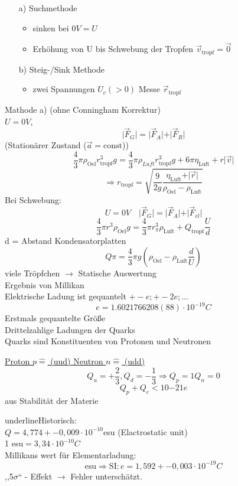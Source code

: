 \documentclass[titlepage,12pt,a4paper,ngerman]{report}
\newcommand{\tx}[1]{\textrm{#1}}
\begin{document}
\begin{itemize}
\item[a)] Suchmethode
\begin{itemize}
\item sinken bei $0V= U$
\item Erhöhung von U bis Schwebung der Tropfen $\vec{v}_{\textrm{tropf}} = \vec{0}$
\end{itemize}
\item[b)] Steig-/Sink Methode
\begin{itemize}
\item zwei Spannungen $U_c(>0)$ Messe $\vec{r}_{\tx{tropf}}$
\end{itemize}
\end{itemize}
Mathode a) (ohne Conningham Korrektur)\\
$U = 0V$, $$\vert \vec{F}_G \vert = \vert \vec{F}_A \vert + \vert \vec{F}_R \vert$$ (Stationärer Zustand ($\vec{a} = \tx{const}$))
$$\frac{4}{3} \pi \rho_{\tx{Oel}} r^3_{\tx{tropf}} g = \frac{4}{3} \pi \rho_{Luft} r_{\tx{tropf}}^3 g + 6 \pi \eta_{\tx{Luft}} + r \vert \vec{v} \vert$$
$$\Rightarrow r_{\tx{tropf}} = \sqrt{\frac{9}{2g} \frac{\eta_{\tx{Luft}} + \vert \vec{r} \vert }{\rho_{\tx{Oel}}-\rho_{\tx{Luft}}}}$$
Bei Schwebung:
$$U = 0V \quad \vert \vec{F}_G \vert = \vert \vec{F}_A \vert + \vert \vec{F}_{el} \vert$$
$$\frac{4}{3} \pi r^3 \rho_{\tx{Oel}} g = \frac{4}{3} \pi r^3_{\pi} \rho_{\tx{Luft}} + Q_{\tx{tropf}} \frac{U}{d}$$
 d = Abstand Kondensatorplatten
$$Q\pi = \frac{4}{3}	\pi g(\rho_{\tx{Oel}}-\rho_{\tx{Luft}} \frac{d}{U})$$
viele Tröpfchen $\rightarrow$ Statische Auswertung\\
Ergebnis von Millikan \\%
Elektrische Ladung ist gequantelt $+- e;+-2e;\dots$
$$e = 1.6021766208(88) \cdot 10^{-19} C$$
Erstmals gequantelte Größe\\
Drittelzahlige Ladungen der Quarks\\
Quarks sind Konstituenten von Protonen und Neutronen\par
\underline{Proton $p \widehat{=}$ (uud) Neutron $n \widehat{=} $ (udd)}
$$Q_u = + \frac{2}{3}, Q_d = - \frac{1}{3} \Rightarrow Q_p = 1 Q_n = 0$$
$$Q_p + Q_e < 10{-21} e$$ aus Stabilität der Materie\par
underline{Historisch:}\\
$Q = 4,774 +- 0,009 \cdot 10^{-10}$esu (Elactrostatic unit)\\
1 esu$ = 3,34 \cdot 10^{-10} C$\\
Millikans wert für Elementarladung: $$ \textrm{esu} \Rightarrow \textrm{SI}: e = 1,592 +- 0,003 \cdot 10 ^{-19} C$$
,,5$\sigma$`` - Effekt $\rightarrow$ Fehler unterschätzt.
\end{document}
